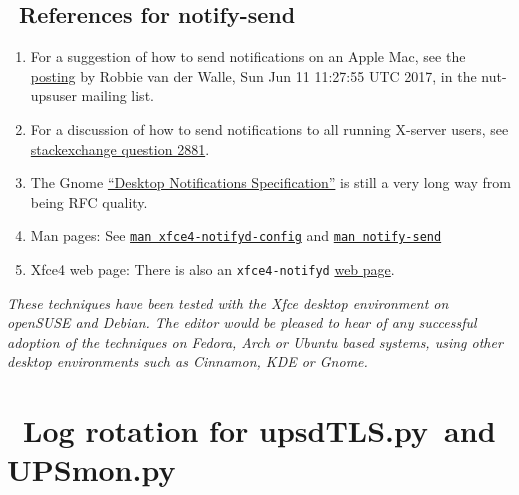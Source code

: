 \documentclass[12pt]{article}
\newlength{\headersep}\setlength{\headersep}{3mm}
\newcommand{\Hsep}{\hspace{\headersep}}
\newcommand{\newcolumn}{\vfill\eject}
\newcommand{\notifysend}{\mbox{\textcolor{NOTIFYCOLOUR}{notify-send}}}
\newcommand{\upsdTLS}{\mbox{\textcolor{UPSDCOLOUR}{upsdTLS.py}}}
\newcommand{\UPSmon}{\mbox{\textcolor{UPSMONCOLOUR}{UPSmon.py}}}
\newcommand{\DEBman}[1]{\href{https://manpages.debian.org/testing/#1}{\texttt{man #1}}}
\newcommand{\ol}{\begin{enumerate}%
   \setlength{\itemsep}{0em}}
\newcommand{\eol}{\end{enumerate}}
\newcommand{\li}{\item}                 %
\begin{document}
\subsection{\Hsep\ References for \notifysend}\label{section:notifysend.references}

\ol

\li For a suggestion of how to send notifications on an Apple Mac, see
the
\href{https://lists.alioth.debian.org/pipermail/nut-upsuser/2017-June/010729.html}{posting}
by Robbie van der Walle, Sun Jun 11 11:27:55 UTC 2017, in the
nut-upsuser mailing list.

\li For a discussion of how to send notifications to all running X-server users, see
\href{https://unix.stackexchange.com/questions/2881/show-a-notification-across-all-running-x-displays}%
{stackexchange question 2881}.

\li The Gnome \href{https://developer.gnome.org/notification-spec/}{``Desktop
  Notifications Specification''} is still a very long way from being RFC quality.

\li Man pages: See \DEBman{xfce4-notifyd-config} and \DEBman{notify-send}

\li Xfce4 web page: There is also an \texttt{xfce4-notifyd}
\href{https://docs.xfce.org/apps/notifyd/start}{web page}.

\eol

\quad

\textsl{These techniques have been tested with the Xfce desktop environment on
  openSUSE and Debian. The editor would be pleased to hear of any successful
  adoption of the techniques on Fedora, Arch or Ubuntu based systems, using
  other desktop environments such as Cinnamon, KDE or Gnome.}

\vspace*{\fill}

\begin{center}
\end{center}

\vspace*{\fill}

%

\clearpage
\section{\Hsep\ Log rotation for \upsdTLS\ and \UPSmon}\label{section:logrotate}
\end{document}
